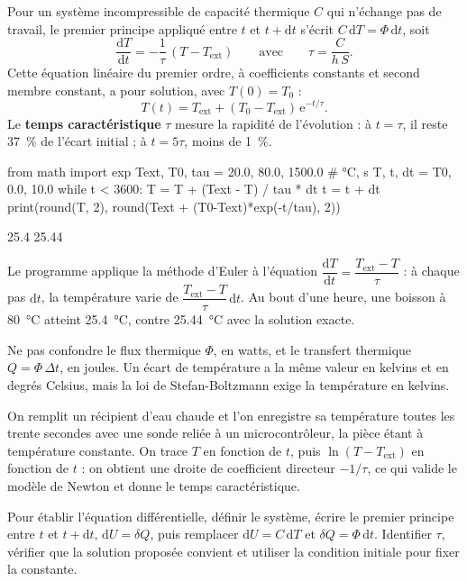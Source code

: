 \begin{savoirfaire}
Pour un système incompressible de capacité thermique $C$ qui n'échange pas de travail, le premier principe appliqué
entre $t$ et $t+\mathrm{d}t$ s'écrit $C\,\mathrm{d}T=\Phi\,\mathrm{d}t$, soit
\[\frac{\mathrm{d}T}{\mathrm{d}t}=-\frac{1}{\tau}\,(T-T_\mathrm{ext})\qquad\text{avec}\qquad\tau=\frac{C}{h\,S}.\]
Cette équation linéaire du premier ordre, à coefficients constants et second membre constant, a pour solution, avec
$T(0)=T_0$ :
\[T(t)=T_\mathrm{ext}+(T_0-T_\mathrm{ext})\,\mathrm{e}^{-t/\tau}.\]
Le \textbf{temps caractéristique} $\tau$ mesure la rapidité de l'évolution : à $t=\tau$, il reste 37~\% de l'écart initial ;
à $t=5\tau$, moins de 1~\%.
\end{savoirfaire}
\begin{codecote}[0.6]
\begin{pythoncol}
from math import exp
Text, T0, tau = 20.0, 80.0, 1500.0  # °C, s
T, t, dt = T0, 0.0, 10.0
while t < 3600:
    T = T + (Text - T) / tau * dt
    t = t + dt
print(round(T, 2),
      round(Text + (T0-Text)*exp(-t/tau), 2))
\end{pythoncol}
\begin{consolecol}
25.4 25.44
\end{consolecol}
\cote
\fontsize{9.5}{12.5}\selectfont
{}\par\smallskip
Le programme applique la méthode d'Euler à l'équation $\dfrac{\mathrm{d}T}{\mathrm{d}t}=\dfrac{T_\mathrm{ext}-T}{\tau}$ : à chaque pas
$\mathrm{d}t$, la température varie de $\dfrac{T_\mathrm{ext}-T}{\tau}\,\mathrm{d}t$. Au bout d'une heure, une boisson à
\qty{80}{\degreeCelsius} atteint \qty{25,4}{\degreeCelsius}, contre \qty{25,44}{\degreeCelsius} avec la solution exacte.
\end{codecote}
\begin{attention}
Ne pas confondre le flux thermique $\Phi$, en watts, et le transfert thermique $Q=\Phi\,\Delta t$, en joules. Un écart de
température a la même valeur en kelvins et en degrés Celsius, mais la loi de Stefan-Boltzmann exige la température
en kelvins.
\end{attention}
\begin{experience}
On remplit un récipient d'eau chaude et l'on enregistre sa température toutes les trente secondes avec une sonde reliée
à un microcontrôleur, la pièce étant à température constante. On trace $T$ en fonction de $t$, puis
$\ln(T-T_\mathrm{ext})$ en fonction de $t$ : on obtient une droite de coefficient directeur $-1/\tau$, ce qui valide le
modèle de Newton et donne le temps caractéristique.
\end{experience}
\begin{rediger}
Pour établir l'équation différentielle, définir le système, écrire le premier principe entre $t$ et $t+\mathrm{d}t$,
$\mathrm{d}U=\delta Q$, puis remplacer $\mathrm{d}U=C\,\mathrm{d}T$ et $\delta Q=\Phi\,\mathrm{d}t$. Identifier $\tau$, vérifier que la
solution proposée convient et utiliser la condition initiale pour fixer la constante.
\end{rediger}
\exercices

